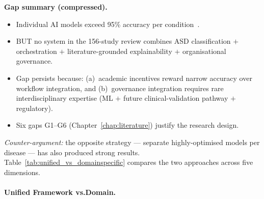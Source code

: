 \noindent\textbf{Gap summary (compressed).}
\begin{itemize}[leftmargin=*, itemsep=2pt]
    \item Individual AI models exceed 95\% accuracy per condition~\cite{esteva2019guide, topol2019deep}.
    \item BUT no system in the 156-study review combines ASD classification $+$ orchestration $+$ literature-grounded explainability $+$ organisational governance.
    \item Gap persists because: (a)~academic incentives reward narrow accuracy over workflow integration, and (b)~governance integration requires rare interdisciplinary expertise (ML $+$ future clinical-validation pathway $+$ regulatory).
    \item Six gaps G1--G6 (Chapter~\ref{chap:literature}) justify the research design.
\end{itemize}

\noindent\textit{Counter-argument:} the opposite strategy --- separate highly-optimised models per disease --- has also produced strong results. Table~\ref{tab:unified_vs_domainspecific} compares the two approaches across five dimensions.

\paragraph{Unified Framework vs.Domain.}




